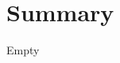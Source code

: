 \documentclass[\main/dresen_thesis.tex]{subfiles}
\begin{document}
\chapter{Summary}\label{ch:summary}

Empty
\end{document}
